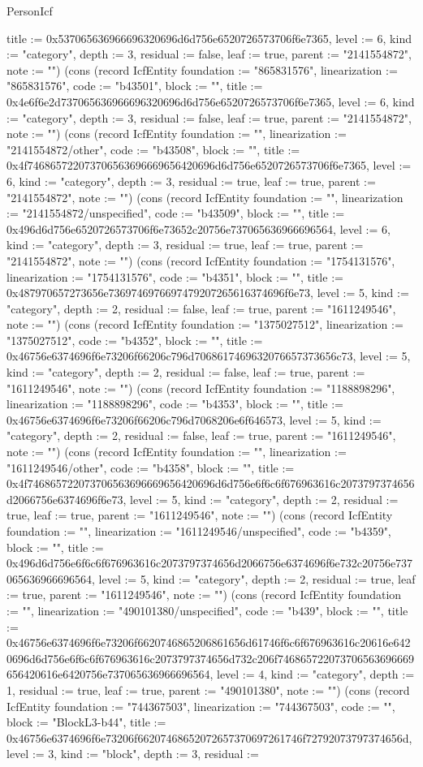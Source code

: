 \begin{lexlean}{PersonIcf}
\begin{semanticmodule}
{title := 0x537065636966696320696d6d756e6520726573706f6e7365, level := 6, kind := "category", depth := 3, residual := false, leaf := true, parent := "2141554872", note := ""}) (cons (record IcfEntity {foundation := "865831576", linearization := "865831576", code := "b43501", block := "", title := 0x4e6f6e2d737065636966696320696d6d756e6520726573706f6e7365, level := 6, kind := "category", depth := 3, residual := false, leaf := true, parent := "2141554872", note := ""}) (cons (record IcfEntity {foundation := "", linearization := "2141554872/other", code := "b43508", block := "", title := 0x4f746865722073706563696669656420696d6d756e6520726573706f6e7365, level := 6, kind := "category", depth := 3, residual := true, leaf := true, parent := "2141554872", note := ""}) (cons (record IcfEntity {foundation := "", linearization := "2141554872/unspecified", code := "b43509", block := "", title := 0x496d6d756e6520726573706f6e73652c20756e737065636966696564, level := 6, kind := "category", depth := 3, residual := true, leaf := true, parent := "2141554872", note := ""}) (cons (record IcfEntity {foundation := "1754131576", linearization := "1754131576", code := "b4351", block := "", title := 0x487970657273656e7369746976697479207265616374696f6e73, level := 5, kind := "category", depth := 2, residual := false, leaf := true, parent := "1611249546", note := ""}) (cons (record IcfEntity {foundation := "1375027512", linearization := "1375027512", code := "b4352", block := "", title := 0x46756e6374696f6e73206f66206c796d7068617469632076657373656c73, level := 5, kind := "category", depth := 2, residual := false, leaf := true, parent := "1611249546", note := ""}) (cons (record IcfEntity {foundation := "1188898296", linearization := "1188898296", code := "b4353", block := "", title := 0x46756e6374696f6e73206f66206c796d7068206e6f646573, level := 5, kind := "category", depth := 2, residual := false, leaf := true, parent := "1611249546", note := ""}) (cons (record IcfEntity {foundation := "", linearization := "1611249546/other", code := "b4358", block := "", title := 0x4f746865722073706563696669656420696d6d756e6f6c6f676963616c2073797374656d2066756e6374696f6e73, level := 5, kind := "category", depth := 2, residual := true, leaf := true, parent := "1611249546", note := ""}) (cons (record IcfEntity {foundation := "", linearization := "1611249546/unspecified", code := "b4359", block := "", title := 0x496d6d756e6f6c6f676963616c2073797374656d2066756e6374696f6e732c20756e737065636966696564, level := 5, kind := "category", depth := 2, residual := true, leaf := true, parent := "1611249546", note := ""}) (cons (record IcfEntity {foundation := "", linearization := "490101380/unspecified", code := "b439", block := "", title := 0x46756e6374696f6e73206f6620746865206861656d61746f6c6f676963616c20616e6420696d6d756e6f6c6f676963616c2073797374656d732c206f746865722073706563696669656420616e6420756e737065636966696564, level := 4, kind := "category", depth := 1, residual := true, leaf := true, parent := "490101380", note := ""}) (cons (record IcfEntity {foundation := "744367503", linearization := "744367503", code := "", block := "BlockL3-b44", title := 0x46756e6374696f6e73206f66207468652072657370697261746f72792073797374656d, level := 3, kind := "block", depth := 3, residual := }
\end{semanticmodule}
\end{lexlean}
